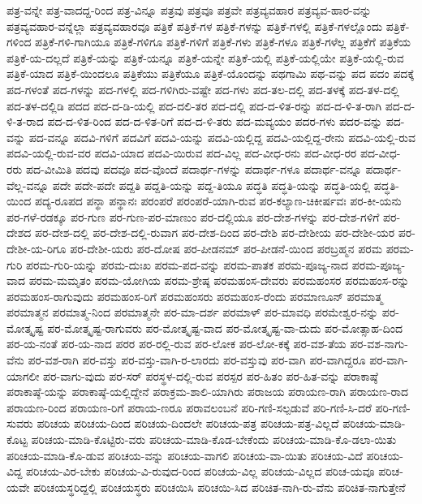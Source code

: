 {ಪತ್ರ-ವನ್ನೇ
ಪತ್ರ-ವಾದದ್ದ-ರಿಂದ
ಪತ್ರ-ವಿನ್ನೂ
ಪತ್ರವು
ಪತ್ರವೂ
ಪತ್ರವೇ
ಪತ್ರವ್ಯವಹಾರ
ಪತ್ರವ್ಯವ-ಹಾರ-ವನ್ನು
ಪತ್ರವ್ಯವಹಾರ-ವನ್ನೆಲ್ಲಾ
ಪತ್ರವ್ಯವಹಾರವೂ
ಪತ್ರಿಕೆ
ಪತ್ರಿಕೆ-ಗಳ
ಪತ್ರಿಕೆ-ಗಳನ್ನು
ಪತ್ರಿಕೆ-ಗಳಲ್ಲಿ
ಪತ್ರಿಕೆ-ಗಳಲ್ಲೊಂದು
ಪತ್ರಿಕೆ-ಗಳಿಂದ
ಪತ್ರಿಕೆ-ಗಳಿ-ಗಾಗಿಯೂ
ಪತ್ರಿಕೆ-ಗಳಿಗೂ
ಪತ್ರಿಕೆ-ಗಳಿಗೆ
ಪತ್ರಿಕೆ-ಗಳು
ಪತ್ರಿಕೆ-ಗಳೂ
ಪತ್ರಿಕೆ-ಗಳೆಲ್ಲ
ಪತ್ರಿಕೆಗೆ
ಪತ್ರಿಕೆಯ
ಪತ್ರಿಕೆ-ಯ-ದಲ್ಲದೆ
ಪತ್ರಿಕೆ-ಯನ್ನು
ಪತ್ರಿಕೆ-ಯನ್ನೂ
ಪತ್ರಿಕೆ-ಯನ್ನೇ
ಪತ್ರಿಕೆ-ಯಲ್ಲಿ
ಪತ್ರಿಕೆ-ಯಲ್ಲಿಯೇ
ಪತ್ರಿಕೆ-ಯಲ್ಲಿ-ರುವ
ಪತ್ರಿಕೆ-ಯಾದ
ಪತ್ರಿಕೆ-ಯಿಂದಲೂ
ಪತ್ರಿಕೆಯು
ಪತ್ರಿಕೆಯೂ
ಪತ್ರಿಕೆ-ಯೊಂದನ್ನು
ಪಥಗಾಮಿ
ಪಥ-ವನ್ನು
ಪದ
ಪದಂ
ಪದಕ್ಕೆ
ಪದ-ಗಳಂತೆ
ಪದ-ಗಳನ್ನು
ಪದ-ಗಳಲ್ಲಿ
ಪದ-ಗಳಿಗಿರು-ವಷ್ಟೇ
ಪದ-ಗಳು
ಪದ-ತಲ-ದಲ್ಲಿ
ಪದ-ತಳಕ್ಕೆ
ಪದ-ತಳ-ದಲ್ಲಿ
ಪದ-ತಳ-ದಲ್ಲಿಡಿ
ಪದದ
ಪದ-ದ-ಡಿ-ಯಲ್ಲಿ
ಪದ-ದಲಿ-ತರ
ಪದ-ದಲ್ಲಿ
ಪದ-ದ-ಳಿತ-ರನ್ನು
ಪದ-ದ-ಳಿ-ತ-ರಾಗಿ
ಪದ-ದ-ಳಿ-ತ-ರಾದ
ಪದ-ದ-ಳಿತ-ರಿಂದ
ಪದ-ದ-ಳಿತ-ರಿಗೆ
ಪದ-ದ-ಳಿ-ತರು
ಪದ-ಮವ್ಯಯಂ
ಪದರ-ಗಳು
ಪದರ-ವನ್ನು
ಪದ-ವನ್ನು
ಪದ-ವನ್ನೂ
ಪದವಿ-ಗಳಿಗೆ
ಪದವಿಗೆ
ಪದವಿ-ಯನ್ನು
ಪದವಿ-ಯಲ್ಲಿದ್ದ
ಪದವಿ-ಯಲ್ಲಿದ್ದ-ರೇನು
ಪದವಿ-ಯಲ್ಲಿ-ರುವ
ಪದವಿ-ಯಲ್ಲಿ-ರುವ-ವರ
ಪದವಿ-ಯಾದ
ಪದವಿ-ಯಿರುವ
ಪದ-ವಿಲ್ಲ
ಪದ-ವೀಧ-ರನು
ಪದ-ವೀಧ-ರರ
ಪದ-ವೀಧ-ರರು
ಪದ-ವೀಮಿತಿ
ಪದವು
ಪದವೂ
ಪದ-ವೊಂದೆ
ಪದಾರ್ಥ-ಗಳನ್ನು
ಪದಾರ್ಥ-ಗಳೂ
ಪದಾರ್ಥ-ವನ್ನೂ
ಪದಾರ್ಥ-ವೆಲ್ಲ-ವನ್ನೂ
ಪದೇ
ಪದೇ-ಪದೇ
ಪದ್ದತಿ
ಪದ್ದತಿ-ಯನ್ನು
ಪದ್ದ-ತಿಯೂ
ಪದ್ಧತಿ
ಪದ್ಧತಿ-ಯನ್ನು
ಪದ್ಧತಿ-ಯಲ್ಲಿ
ಪದ್ಧತಿ-ಯಿಂದ
ಪದ್ಯ-ರೂಪದ
ಪನ್ಥಾ
ಪನ್ಥಾನಃ
ಪರಂಪರೆ
ಪರಂಪರೆ-ಯಾಗಿ-ರುವ
ಪರ-ಕಲ್ಯಾಣ-ಚಿಕೀರ್ಷವಃ
ಪರ-ಕೀ-ಯನು
ಪರ-ಗಳೆ-ರಡಕ್ಕೂ
ಪರ-ಗುಣ
ಪರ-ಗುಣ-ಪರ-ಮಾಣುಂ
ಪರ-ದಲ್ಲಿಯೂ
ಪರ-ದೇಶ-ಗಳನ್ನು
ಪರ-ದೇಶ-ಗಳಿಗೆ
ಪರ-ದೇಶದ
ಪರ-ದೇಶ-ದಲ್ಲಿ
ಪರ-ದೇಶ-ದಲ್ಲಿ-ರುವಾಗ
ಪರ-ದೇಶ-ದಿಂದ
ಪರ-ದೇಶಿ
ಪರ-ದೇಶೀಯ
ಪರ-ದೇಶೀ-ಯರ
ಪರ-ದೇಶೀ-ಯ-ರಿಗೂ
ಪರ-ದೇಶೀ-ಯರು
ಪರ-ದೋಷ
ಪರ-ಪೀಡನಮ್
ಪರ-ಪೀಡನೆ-ಯಿಂದ
ಪರಬ್ರಹ್ಮನ
ಪರಮ
ಪರಮ-ಗುರಿ
ಪರಮ-ಗುರಿ-ಯನ್ನು
ಪರಮ-ದುಃಖ
ಪರಮ-ಪದ-ವನ್ನು
ಪರಮ-ಪಾತಕ
ಪರಮ-ಪೂಜ್ಯ-ನಾದ
ಪರಮ-ಪೂಜ್ಯ-ವಾದ
ಪರಮ-ಮಮೃತಂ
ಪರಮ-ಯೋಗಿಯ
ಪರಮ-ಶ್ರೇಷ್ಠ
ಪರಮಹಂಸ-ದೇವರು
ಪರಮಹಂಸರ
ಪರಮಹಂಸ-ರನ್ನು
ಪರಮಹಂಸ-ರಾಗುವುದು
ಪರಮಹಂಸ-ರಿಗೆ
ಪರಮಹಂಸರು
ಪರಮಹಂಸ-ರೆಂದು
ಪರಮಾಣೂನ್
ಪರಮಾತ್ಮ
ಪರಮಾತ್ಮನ
ಪರಮಾತ್ಮ-ನಿಂದ
ಪರಮಾತ್ಮನೇ
ಪರ-ಮಾ-ದರ್ಶ
ಪರಮಾಳ್
ಪರ-ಮಾವಧಿ
ಪರಮೇಶ್ವರ-ನನ್ನು
ಪರ-ಮೋತ್ಕೃಷ್ಟ
ಪರ-ಮೋತ್ಕೃಷ್ಟ-ರಾಗುವರು
ಪರ-ಮೋತ್ಕೃಷ್ಟ-ವಾದ
ಪರ-ಮೋತ್ಕೃಷ್ಟ-ವಾ-ದುದು
ಪರ-ಮೋತ್ಸಾಹ-ದಿಂದ
ಪರ-ಯ-ನಂತೆ
ಪರ-ಯ-ನಾದ
ಪರರ
ಪರ-ರಲ್ಲಿ-ರುವ
ಪರ-ಲೋಕ
ಪರ-ಲೋ-ಕಕ್ಕೆ
ಪರ-ವಶ-ತೆಯ
ಪರ-ವಶ-ನಾಗು-ವೆನು
ಪರ-ವಶ-ರಾಗಿ
ಪರ-ವಸ್ತು
ಪರ-ವಸ್ತು-ವಾಗಿ-ರ-ಲಾರದು
ಪರ-ವಸ್ತುವು
ಪರ-ವಾಗಿ
ಪರ-ವಾಗಿದ್ದರೂ
ಪರ-ವಾಗಿ-ಯಾಗಲೀ
ಪರ-ವಾಗು-ವುದು
ಪರ-ಸರ್
ಪರಸ್ಥಳ-ದಲ್ಲಿ-ರುವ
ಪರಸ್ಪರ
ಪರ-ಹಿತಂ
ಪರ-ಹಿತ-ವನ್ನು
ಪರಾಕಾಷ್ಠೆ
ಪರಾಕಾಷ್ಠೆ-ಯನ್ನು
ಪರಾಕಾಷ್ಠೆ-ಯಲ್ಲಿದ್ದೇನೆ
ಪರಾಕ್ರಮ-ಶಾಲಿ-ಯಾಗಿರು
ಪರಾಜಯ
ಪರಾಯಣ-ರಾಗಿ
ಪರಾಯಣ-ರಾದ
ಪರಾಯಣ-ರಿಂದ
ಪರಾಯಣ-ರಿಗೆ
ಪರಾಯ-ಣರೂ
ಪರಾವಲಂಬನೆ
ಪರಿ-ಗಣಿ-ಸಲ್ಪಡುವೆ
ಪರಿ-ಗಣಿ-ಸಿ-ದರೆ
ಪರಿ-ಗಣಿ-ಸುವರು
ಪರಿಚಯ
ಪರಿಚಯ-ದಿಂದ
ಪರಿಚಯ-ದಿಂದಲೇ
ಪರಿಚಯ-ಪತ್ರ
ಪರಿಚಯ-ಪತ್ರ-ವಿಲ್ಲದೆ
ಪರಿಚಯ-ಮಾಡಿ-ಕೊಟ್ಟ
ಪರಿಚಯ-ಮಾಡಿ-ಕೊಟ್ಟಿರು-ವರು
ಪರಿಚಯ-ಮಾಡಿ-ಕೊಡ-ಬೇಕೆಂದು
ಪರಿಚಯ-ಮಾಡಿ-ಕೊ-ಡಲಾ-ಯಿತು
ಪರಿಚಯ-ಮಾಡಿ-ಕೊ-ಡುವ
ಪರಿಚಯ-ವನ್ನು
ಪರಿಚಯ-ವಾಗಲಿ
ಪರಿಚಯ-ವಾ-ಯಿತು
ಪರಿಚಯ-ವಿದೆ
ಪರಿಚಯ-ವಿದ್ದ
ಪರಿಚಯ-ವಿರ-ಬೇಕು
ಪರಿಚಯ-ವಿ-ರುವುದ-ರಿಂದ
ಪರಿಚಯ-ವಿಲ್ಲ
ಪರಿಚಯ-ವಿಲ್ಲದ
ಪರಿಚ-ಯವೂ
ಪರಿಚ-ಯವೇ
ಪರಿಚಯಸ್ಥರಿದ್ದಲ್ಲಿ
ಪರಿಚಯಸ್ಥರು
ಪರಿಚಯಿಸಿ
ಪರಿಚಯಿ-ಸಿದ
ಪರಿಚಿತ-ನಾಗಿ-ರು-ವೆನು
ಪರಿಚಿತ-ನಾಗುತ್ತೇನೆ
}
